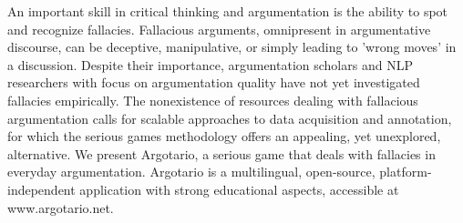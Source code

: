 An important skill in critical thinking and argumentation is the ability to spot and recognize fallacies. Fallacious arguments, omnipresent in argumentative discourse, can be deceptive, manipulative, or simply leading to 'wrong moves' in a discussion. Despite their importance, argumentation scholars and NLP researchers with focus on argumentation quality have not yet investigated fallacies empirically. The nonexistence of resources dealing with fallacious argumentation calls for scalable approaches to data acquisition and annotation, for which the serious games methodology offers an appealing, yet unexplored, alternative. We present Argotario, a serious game that deals with fallacies in everyday argumentation. Argotario is a multilingual, open-source, platform-independent application with strong educational aspects, accessible at www.argotario.net.
